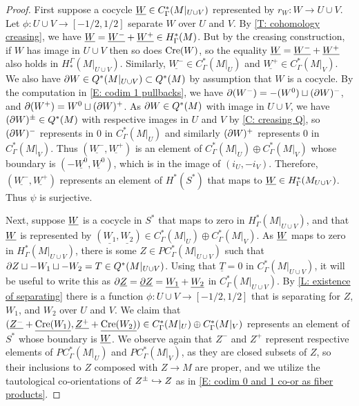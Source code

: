 \begin{proof}
	First suppose a cocycle $\underline{W} \in C_{\Gamma}^*(M|_{U \cup V})$ represented by $r_W \colon W \to U \cup V$.
	Let $\phi \colon U \cup V \to [-1/2,1/2]$ separate $W$ over $U$ and $V$.
	By \cref{T: cohomology creasing}, we have $\underline{W} = \underline{W^-}+\underline{W^+} \in H^*_\Gamma(M)$.
	But by the creasing construction, if $W$ has image in $U \cup V$ then so does $\mathrm{Cre}(W)$, so the equality $\underline{W} = \underline{W^-}+\underline{W^+}$ also holds in $H_*^\Gamma(M|_{U \cup V})$.
	Similarly, $\underline{W^-} \in C_{\Gamma}^*(M|_{U})$ and $\underline{W^+} \in C_{\Gamma}^*(M|_{V})$.
	We also have $\partial W \in Q^*(M|_{U \cup V}) \subset Q^*(M)$ by assumption that $W$ is a cocycle.
	By the computation in \cref{E: codim 1 pullbacks}, we have $\partial(W^-) = -(W^0) \sqcup (\partial W)^-$, and $\partial (W^+) = W^0 \sqcup (\partial W)^+$.
	As $\partial W \in Q^*(M)$ with image in $U \cup V$, we have $(\partial W)^\pm \in Q^*(M)$ with respective images in $U$ and $V$ by \cref{C: creasing Q}, so $(\partial W)^-$ represents in $0$ in $C^*_\Gamma(M|_U)$ and similarly $(\partial W)^+$ represents $0$ in $C^*_\Gamma(M|_V)$.
	Thus $(\underline{W^-}, \underline{W^+})$ is an element of $C_{\Gamma}^*(M|_U) \oplus C_{\Gamma}^{*}(M|_V)$ whose boundary is $(-\underline{W^0},\underline{W^0})$, which is in the image of $(i_U,-i_V)$.
	Therefore, $(\underline{W^-}, \underline{W^+})$ represents an element of
	$H^*(S^*)$ that maps to $\underline{W} \in H^*_\Gamma(M_{U \cup V})$.
	Thus $\psi$ is surjective.

	Next, suppose $\underline{W}$ is a cocycle in $S^*$ that maps to zero in $H_{\Gamma}^*(M|_{U \cup V})$, and that $\underline{W}$ is represented by $(\underline{W_1},\underline{W_2}) \in C^*_\Gamma(M|_U) \oplus C^*_\Gamma(M|_V)$.
	As $\underline{W}$ maps to zero in $H_{\Gamma}^*(M|_{U \cup V})$, there is some $Z \in PC^*_\Gamma(M|_{U \cup V})$ such that $\partial Z \sqcup - W_1 \sqcup -W_2 = T \in Q^*(M|_{U \cup V})$.
	Using that $\underline T = 0$ in $C^*_\Gamma(M|_{U \cup V})$, it will be useful to write this as $\partial \underline{Z} = \underline{\partial Z} = \underline{W_1} + \underline {W_2}$ in $C^*_\Gamma(M|_{U \cup V})$.
	By \cref{L: existence of separating} there is a function $\phi \colon U \cup V \to [-1/2,1/2]$ that is separating for $Z$, $W_1$, and $W_2$ over $U$ and $V$.
  	We claim that $(\underline{Z^-}+\underline{\mathrm{Cre}(W_1)},\underline{Z^+}+\underline{\mathrm{Cre}(W_2)}) \in C^*_\Gamma(M|_U) \oplus C^*_\Gamma(M|_V)$ represents an element of $S^*$ whose boundary is $\underline{W}$.
	We observe again that $Z^-$ and $Z^+$ represent respective elements of $PC^*_\Gamma(M|_U)$ and $PC^*_\Gamma(M|_V)$, as they are closed subsets of $Z$, so their inclusions to $Z$ composed with $Z \to M$ are proper, and we utilize the tautological co-orientations of $Z^\pm \hookrightarrow Z$ as in \cref{E: codim 0 and 1 co-or as fiber products}.


\end{proof}
